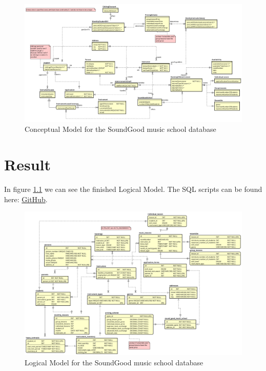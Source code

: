 \documentclass[a4paper]{scrreprt}
\begin{document}
\begin{figure}[h]
    \begin{center}
        \includegraphics[width=\textwidth]{../img/conceptualModel.v1.0.1.png}
        \caption{Conceptual Model for the SoundGood music school database}
        \label{fig:conceptualModel}
    \end{center}
\end{figure}

\chapter{Result}

\label{sec:result}
In figure \ref{fig:logicalModel} we can see the finished Logical Model. The SQL scripts can be found here:
 \href{https://github.com/adrian-jonsson-sjoedin/IV1351-Datalagring/tree/main/project/SQL}{GitHub}.


\begin{figure}[h]
    \begin{center}
        \includegraphics[width=\textwidth]{../img/LogicalModel.png}
        \caption{Logical Model for the SoundGood music school database}
        \label{fig:logicalModel}
    \end{center}
\end{figure}
\end{document}
